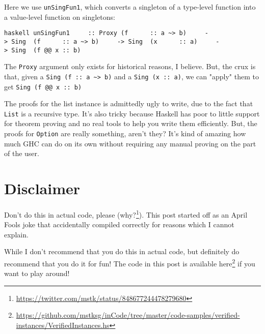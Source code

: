 \documentclass[]{article}
\renewcommand{\href}[2]{#2\footnote{\url{#1}}}
\begin{document}
Here we use \texttt{unSingFun1}, which converts a singleton of a type-level
function into a value-level function on singletons:

\texttt{haskell\ unSingFun1\ \ \ \ \ ::\ Proxy\ (f\ \ \ \ \ \ ::\ a\ \textasciitilde{}\textgreater{}\ b)\ \ \ \ \ -\textgreater{}\ Sing\ \ (f\ \ \ \ \ \ ::\ a\ \textasciitilde{}\textgreater{}\ b)\ \ \ \ \ -\textgreater{}\ Sing\ \ (x\ \ \ \ \ \ ::\ a)\ \ \ \ \ -\textgreater{}\ Sing\ \ (f\ @@\ x\ ::\ b)}

The \texttt{Proxy} argument only exists for historical reasons, I believe. But,
the crux is that, given a
\texttt{Sing\ (f\ ::\ a\ \textasciitilde{}\textgreater{}\ b)} and a
\texttt{Sing\ (x\ ::\ a)}, we can "apply" them to get
\texttt{Sing\ (f\ @@\ x\ ::\ b)}

The proofs for the list instance is admittedly ugly to write, due to the fact
that \texttt{List} is a recursive type. It's also tricky because Haskell has
poor to little support for theorem proving and no real tools to help you write
them efficiently. But, the proofs for \texttt{Option} are really something,
aren't they? It's kind of amazing how much GHC can do on its own without
requiring any manual proving on the part of the user.

\section{Disclaimer}

Don't do this in actual code, please
(\href{https://twitter.com/mstk/status/848677244478279680}{why?}). This post
started off as an April Fools joke that accidentally compiled correctly for
reasons which I cannot explain.

While I don't recommend that you do this in actual code, but definitely do
recommend that you do it for fun! The code in this post is available
\href{https://github.com/mstksg/inCode/tree/master/code-samples/verified-instances/VerifiedInstances.hs}{here}
if you want to play around!
\end{document}
